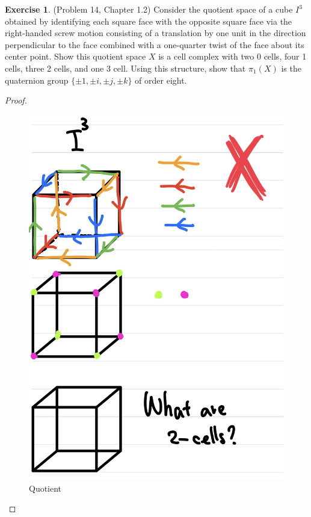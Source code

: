 \documentclass[12pt, psamsfonts]{amsart}
\theoremstyle{definition}
\newtheorem*{exer}{Exercise}
\theoremstyle{remark}
\numberwithin{equation}{section}
\begin{document}
\begin{exer}{(Problem 14, Chapter 1.2)}
  Consider the quotient space of a cube $I^3$ obtained by identifying each square face with the opposite square face via the right-handed screw motion consisting of a translation by one unit in the direction perpendicular to the face combined with a one-quarter twist of the face about its center point.
  Show this quotient space $X$ is a cell complex with two 0 cells, four 1 cells, three 2 cells, and one 3 cell.
  Using this structure, show that $\pi_1(X)$ is the quaternion group $\{ \pm 1, \pm i, \pm j, \pm k \}$ of order eight.
\end{exer}

\begin{proof}
  \begin{figure}
    \includegraphics[width=.5\linewidth]{cube_quotient_delete.jpeg}
    \caption{Quotient}
    \label{fig:quotient_delete}
  \end{figure}
  \begin{figure}

\end{figure}
\end{proof}
\end{document}
